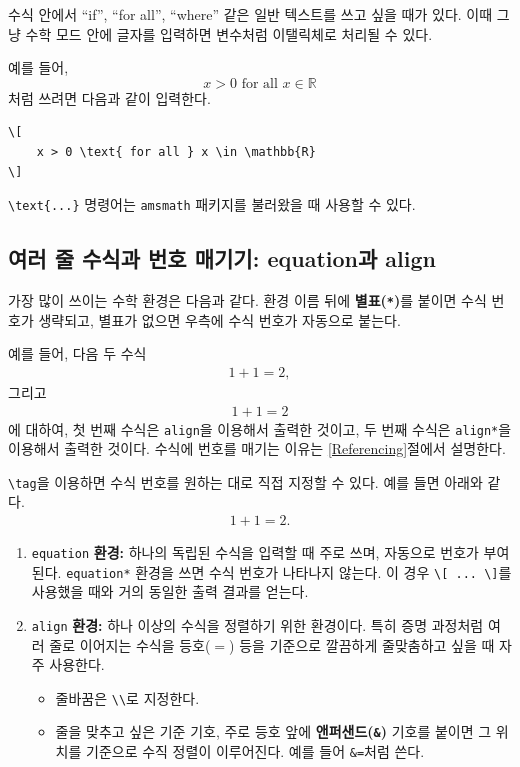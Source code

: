 \documentclass[11pt, a4paper]{article}
\newcommand{\bbr}{\mathbb{R}} %
\theoremstyle{plain}
\theoremstyle{definition}
\theoremstyle{remark}
\begin{document}
수식 안에서 ``if'', ``for all'', ``where'' 같은 일반 텍스트를 쓰고 싶을 때가 있다. 이때 그냥 수학 모드 안에 글자를 입력하면 변수처럼 이탤릭체로 처리될 수 있다.

예를 들어,
\[
    x > 0 \text{ for all } x \in \bbr
\]
처럼 쓰려면 다음과 같이 입력한다.

\begin{verbatim}
\[
    x > 0 \text{ for all } x \in \mathbb{R}
\]
\end{verbatim}

\verb|\text{...}| 명령어는 \verb|amsmath| 패키지를 불러왔을 때 사용할 수 있다.

\subsection{여러 줄 수식과 번호 매기기: equation과 align}

가장 많이 쓰이는 수학 환경은 다음과 같다. 환경 이름 뒤에 \textbf{별표(\texttt{*})}를 붙이면 수식 번호가 생략되고, 별표가 없으면 우측에 수식 번호가 자동으로 붙는다.

예를 들어, 다음 두 수식
\begin{align}\label{eqn1}
    1+1 = 2,
\end{align}
그리고
\begin{align*}
    1+1 = 2
\end{align*}
에 대하여,
첫 번째 수식은 \verb|align|을 이용해서 출력한 것이고, 두 번째 수식은 \verb|align*|을 이용해서 출력한 것이다. 수식에 번호를 매기는 이유는 \ref{Referencing}절에서 설명한다.

\verb|\tag|을 이용하면 수식 번호를 원하는 대로 직접 지정할 수 있다.
예를 들면 아래와 같다.
\begin{align}\tag{멋진 수식}\label{eqn2}
    1+1 = 2.
\end{align}

\begin{enumerate}
    \item \verb|equation| \textbf{환경:}
    하나의 독립된 수식을 입력할 때 주로 쓰며, 자동으로 번호가 부여된다.
    \verb|equation*| 환경을 쓰면 수식 번호가 나타나지 않는다.
    이 경우 \verb|\[ ... \]|를 사용했을 때와 거의 동일한 출력 결과를 얻는다.

    \item \verb|align| \textbf{환경:}
    하나 이상의 수식을 정렬하기 위한 환경이다.
    특히 증명 과정처럼 여러 줄로 이어지는 수식을 등호($=$) 등을 기준으로
    깔끔하게 줄맞춤하고 싶을 때 자주 사용한다.
    \begin{itemize}
        \item 줄바꿈은 \verb|\\|로 지정한다.
        \item 줄을 맞추고 싶은 기준 기호, 주로 등호 앞에
        \textbf{앤퍼샌드(\texttt{\&})} 기호를 붙이면
        그 위치를 기준으로 수직 정렬이 이루어진다.
        예를 들어 \verb|&=|처럼 쓴다.
    \end{itemize}
\end{enumerate}
\end{document}
